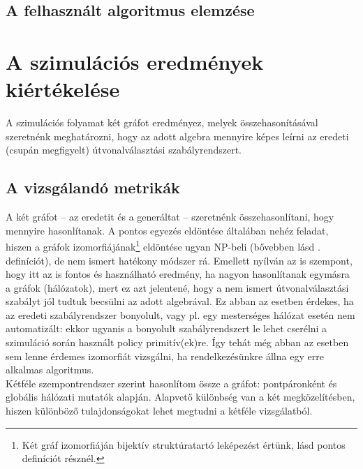     \subsection{A felhasznált algoritmus elemzése}

                \todo

  \section{A szimulációs eredmények kiértékelése}
  A szimulációs folyamat két gráfot eredményez, melyek összehasonításával szeretnénk meghatározni, hogy az adott algebra mennyire képes leírni az eredeti (csupán megfigyelt) útvonalválasztási szabályrendszert.

    \subsection{A vizsgálandó metrikák}
    A két gráfot -- az eredetit és a generáltat -- szeretnénk összehasonlítani, hogy mennyire hasonlítanak. A pontos egyezés eldöntése általában nehéz feladat, hiszen a gráfok izomorfiájának\footnote{Két gráf izomorfiáján bijektív struktúratartó leképezést értünk, lásd pontos definíciót  résznél.} eldöntése ugyan NP-beli (bővebben lásd . definíciót), de nem ismert hatékony módszer rá. Emellett nyílván az is szempont, hogy itt az is fontos és használható eredmény, ha nagyon hasonlítanak egymásra a gráfok (hálózatok), mert ez azt jelentené, hogy a nem ismert útvonalválasztási szabályt jól tudtuk becsülni az adott algebrával. Ez abban az esetben érdekes, ha az eredeti szabályrendszer bonyolult, vagy pl. egy mesterséges hálózat esetén nem automatizált: ekkor ugyanis a bonyolult szabályrendszert le lehet cserélni a szimuláció során használt policy primitív(ek)re. Így tehát még abban az esetben sem lenne érdemes izomorfiát vizsgálni, ha rendelkezésünkre állna egy erre alkalmas algoritmus.\\

    Kétféle szempontrendszer szerint hasonlítom össze a gráfot: pontpáronként és globális hálózati mutatók alapján. Alapvető különbség van a két megközelítésben, hiszen különböző tulajdonságokat lehet megtudni a kétféle vizsgálatból.\\


